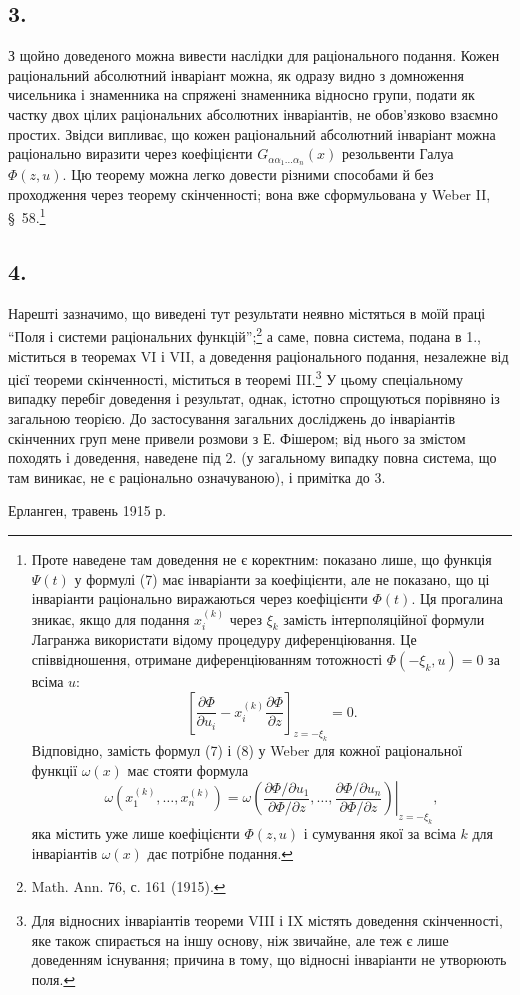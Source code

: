 \documentclass[11pt]{article}
\begin{document}
\subsection*{3.}
З щойно доведеного можна вивести наслідки для раціонального подання. Кожен раціональний абсолютний інваріант можна, як одразу видно з домноження чисельника і знаменника на спряжені знаменника відносно групи, подати як частку двох цілих раціональних абсолютних інваріантів, не обов'язково взаємно простих. Звідси випливає, що кожен раціональний абсолютний інваріант можна раціонально виразити через коефіцієнти $G_{\alpha\alpha_1\ldots\alpha_n}(x)$ резольвенти Галуа $\Phi(z,u)$. Цю теорему можна легко довести різними способами й без проходження через теорему скінченності; вона вже сформульована у Weber II, \S\ 58.\footnote{Проте наведене там доведення не є коректним: показано лише, що функція $\Psi(t)$ у формулі (7) має інваріанти за коефіцієнти, але не показано, що ці інваріанти раціонально виражаються через коефіцієнти $\Phi(t)$. Ця прогалина зникає, якщо для подання $x_i^{(k)}$ через $\xi_k$ замість інтерполяційної формули Лагранжа використати відому процедуру диференціювання. Це співвідношення, отримане диференціюванням тотожності $\Phi(-\xi_k,u)=0$ за всіма $u$:
\[
 \left[\frac{\partial\Phi}{\partial u_i}
      -x_i^{(k)}\frac{\partial\Phi}{\partial z}\right]_{z=-\xi_k}=0.
\]
Відповідно, замість формул (7) і (8) у Weber для кожної раціональної функції $\omega(x)$ має стояти формула
\[
 \omega(x_1^{(k)},\ldots,x_n^{(k)})=
 \left.
 \omega\!\left(
   \frac{\partial\Phi/\partial u_1}{\partial\Phi/\partial z},\ldots,
   \frac{\partial\Phi/\partial u_n}{\partial\Phi/\partial z}
 \right)\right|_{z=-\xi_k},
\]
яка містить уже лише коефіцієнти $\Phi(z,u)$ і сумування якої за всіма $k$ для інваріантів $\omega(x)$ дає потрібне подання.}

\subsection*{4.}
Нарешті зазначимо, що виведені тут результати неявно містяться в моїй праці ``Поля і системи раціональних функцій'';\footnote{Math. Ann. 76, с. 161 (1915).} а саме, повна система, подана в 1., міститься в теоремах VI і VII, а доведення раціонального подання, незалежне від цієї теореми скінченності, міститься в теоремі III.\footnote{Для відносних інваріантів теореми VIII і IX містять доведення скінченності, яке також спирається на іншу основу, ніж звичайне, але теж є лише доведенням існування; причина в тому, що відносні інваріанти не утворюють поля.} У цьому спеціальному випадку перебіг доведення і результат, однак, істотно спрощуються порівняно із загальною теорією. До застосування загальних досліджень до інваріантів скінченних груп мене привели розмови з Е. Фішером; від нього за змістом походять і доведення, наведене під 2. (у загальному випадку повна система, що там виникає, не є раціонально означуваною), і примітка до 3.

Ерланген, травень 1915 р.
\end{document}
